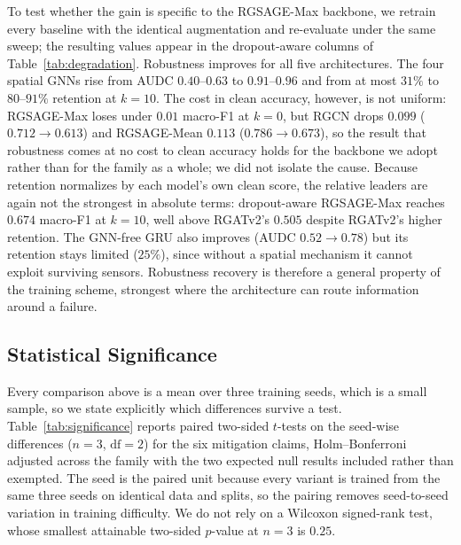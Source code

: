 \documentclass[3p,times,procedia]{elsarticle}
\begin{document}
To test whether the gain is specific to the RGSAGE-Max backbone, we retrain every baseline with the identical augmentation and re-evaluate under the same sweep; the resulting values appear in the dropout-aware columns of Table~\ref{tab:degradation}. Robustness improves for all five architectures. The four spatial GNNs rise from AUDC $0.40$--$0.63$ to $0.91$--$0.96$ and from at most $31\%$ to $80$--$91\%$ retention at $k=10$. The cost in clean accuracy, however, is not uniform: RGSAGE-Max loses under $0.01$ macro-F1 at $k=0$, but RGCN drops $0.099$ ($0.712\to0.613$) and RGSAGE-Mean $0.113$ ($0.786\to0.673$), so the result that robustness comes at no cost to clean accuracy holds for the backbone we adopt rather than for the family as a whole; we did not isolate the cause. Because retention normalizes by each model's own clean score, the relative leaders are again not the strongest in absolute terms: dropout-aware RGSAGE-Max reaches $0.674$ macro-F1 at $k=10$, well above RGATv2's $0.505$ despite RGATv2's higher retention. The GNN-free GRU also improves (AUDC $0.52\to0.78$) but its retention stays limited ($25\%$), since without a spatial mechanism it cannot exploit surviving sensors. Robustness recovery is therefore a general property of the training scheme, strongest where the architecture can route information around a failure.

\subsection{Statistical Significance}
\label{sec:res-significance}

Every comparison above is a mean over three training seeds, which is a small sample, so we state explicitly which differences survive a test. Table~\ref{tab:significance} reports paired two-sided $t$-tests on the seed-wise differences ($n=3$, $\mathrm{df}=2$) for the six mitigation claims, Holm--Bonferroni adjusted across the family with the two expected null results included rather than exempted. The seed is the paired unit because every variant is trained from the same three seeds on identical data and splits, so the pairing removes seed-to-seed variation in training difficulty. We do not rely on a Wilcoxon signed-rank test, whose smallest attainable two-sided $p$-value at $n=3$ is $0.25$.
\end{document}
